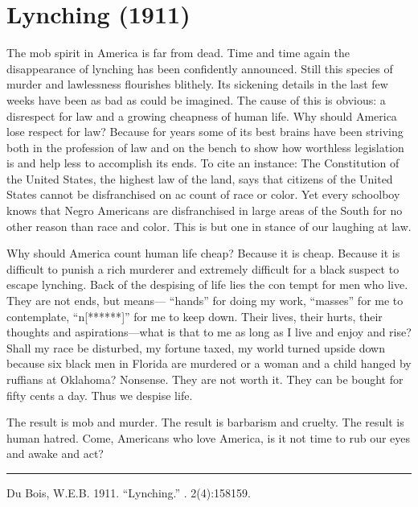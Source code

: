 \documentclass[letterpaper,10pt,english]{jupyterBook}
\begin{document}
\section{Lynching (1911)}
\label{\detokenize{Volumes/02/04/lynching:lynching-1911}}\label{\detokenize{Volumes/02/04/lynching::doc}}
\sphinxAtStartPar
The mob spirit in America is far from dead. Time and time again the disappearance of lynching has been confidently announced. Still this species of murder and lawlessness flourishes blithely. Its sickening details in the last few weeks have been as bad as could be imagined. The cause of this is obvious: a disrespect for law and a growing cheapness of human life. Why should America lose respect for law? Because for years some of its best brains have been striving both in the profession of law and on the bench to show how worthless legislation is and help­ less to accomplish its ends. To cite an instance: The Constitution of the United States, the highest law of the land, says that citizens of the United States cannot be disfranchised on ac­ count of race or color. Yet every schoolboy knows that Negro Americans are disfranchised in large areas of the South for no other reason than race and color. This is but one in­ stance of our laughing at law.

\sphinxAtStartPar
Why should America count human life cheap? Because it is cheap. Because it is difficult to punish a rich murderer and extremely difficult for a black suspect to escape lynching. Back of the despising of life lies the con­ tempt for men who live. They are not ends, but means— “hands” for doing my work, “masses” for me to contemplate, “n{[}******{]}” for me to keep down. Their lives, their hurts, their thoughts and aspirations—what is that to me as long as I live and enjoy and rise? Shall my race be disturbed, my fortune taxed, my world turned upside down because six black men in Florida are murdered or a woman and a child hanged by ruffians at Oklahoma? Nonsense. They are not worth it. They can be bought for fifty cents a day. Thus we despise life.

\sphinxAtStartPar
The result is mob and murder. The result is barbarism and cruelty. The result is human hatred. Come, Americans who love America, is it not time to rub our eyes and awake and act?


\bigskip\hrule\bigskip


\sphinxAtStartPar
{} Du Bois, W.E.B. 1911. “Lynching.”  . 2(4):158\sphinxhyphen{}159.
\end{document}
